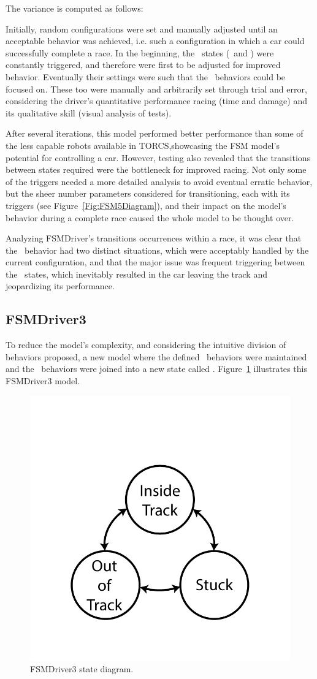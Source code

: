 The variance is computed as follows: 

Initially, random configurations were set and manually adjusted until an acceptable behavior was achieved, i.e. such a configuration in which a car could successfully complete a race. In the beginning, the \recovery~states (\OT~and \St) were constantly triggered, and therefore were first to be adjusted for improved behavior. Eventually their settings were such that the \racing~behaviors could be focused on. These too were manually and arbitrarily set through trial and error, considering the driver's quantitative performance racing (time and damage) and its qualitative skill (visual analysis of tests).

After several iterations, this model performed better performance than some of the less capable robots available in TORCS,showcasing the FSM model's potential for controlling a car. However, testing also revealed that the transitions between states required were the bottleneck for improved racing. Not only some of the triggers needed a more detailed analysis to avoid eventual erratic behavior, but the sheer number parameters considered for transitioning, each with its triggers (see Figure~\ref{Fig:FSM5Diagram}), and their impact on the model's behavior during a complete race caused the whole model to be thought over.

Analyzing FSMDriver's transitions occurrences within a race, it was clear that the \recovery~behavior had two distinct situations, which were acceptably handled by the current configuration, and that the major issue was frequent triggering between the \racing~states, which inevitably resulted in the car leaving the track and jeopardizing its performance.

\subsection{FSMDriver3}%
To reduce the model's complexity, and considering the intuitive division of behaviors proposed, a new model where the defined \recovery~behaviors were maintained and the \racing~behaviors were joined into a new state called \IT. Figure~\ref{Fig:FSM3Diagram} illustrates this FSMDriver3 model.

\begin{figure}[h]
	\centering
	\includegraphics[width=.4\textwidth]{img/ThreeStateFSM}
	\caption{FSMDriver3 state diagram.}
	\label{Fig:FSM3Diagram}
\end{figure}

